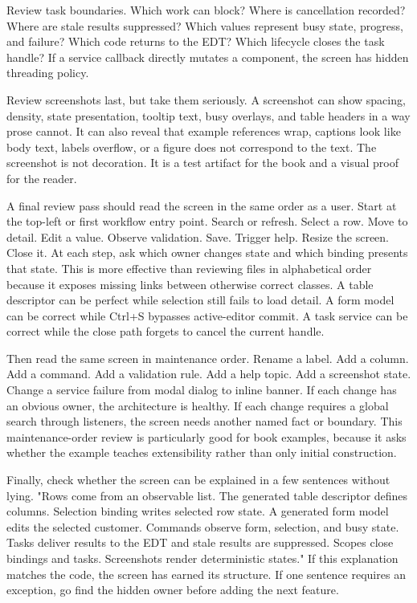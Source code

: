 Review task boundaries. Which work can block? Where is cancellation recorded?
Where are stale results suppressed? Which values represent busy state,
progress, and failure? Which code returns to the EDT? Which lifecycle closes
the task handle? If a service callback directly mutates a component, the
screen has hidden threading policy.

Review screenshots last, but take them seriously. A screenshot can show
spacing, density, state presentation, tooltip text, busy overlays, and table
headers in a way prose cannot. It can also reveal that example references wrap,
captions look like body text, labels overflow, or a figure does not correspond
to the text. The screenshot is not decoration. It is a test artifact for the
book and a visual proof for the reader.

A final review pass should read the screen in the same order as a user. Start
at the top-left or first workflow entry point. Search or refresh. Select a row.
Move to detail. Edit a value. Observe validation. Save. Trigger help. Resize
the screen. Close it. At each step, ask which owner changes state and which
binding presents that state. This is more effective than reviewing files in
alphabetical order because it exposes missing links between otherwise correct
classes. A table descriptor can be perfect while selection still fails to load
detail. A form model can be correct while Ctrl+S bypasses active-editor
commit. A task service can be correct while the close path forgets to cancel
the current handle.

Then read the same screen in maintenance order. Rename a label. Add a column.
Add a command. Add a validation rule. Add a help topic. Add a screenshot state.
Change a service failure from modal dialog to inline banner. If each change
has an obvious owner, the architecture is healthy. If each change requires a
global search through listeners, the screen needs another named fact or
boundary. This maintenance-order review is particularly good for book
examples, because it asks whether the example teaches extensibility rather
than only initial construction.

Finally, check whether the screen can be explained in a few sentences without
lying. "Rows come from an observable list. The generated table descriptor
defines columns. Selection binding writes selected row state. A generated form
model edits the selected customer. Commands observe form, selection, and busy
state. Tasks deliver results to the EDT and stale results are suppressed.
Scopes close bindings and tasks. Screenshots render deterministic states."
If this explanation matches the code, the screen has earned its structure. If
one sentence requires an exception, go find the hidden owner before adding the
next feature.

